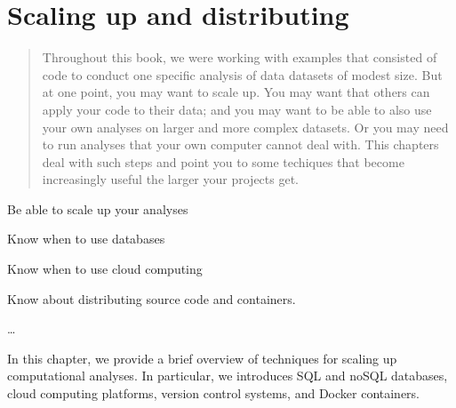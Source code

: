\chapter{Scaling up and distributing}
\label{chap:scalingup}

\begin{abstract}
  Throughout this book, we were working with examples that consisted of
  code to conduct one specific analysis of data datasets of modest size.
  But at one point, you may want to scale up. You may want that others
  can apply your code to their data; and you may want to be able to also
  use your own analyses on larger and more complex datasets. Or you may
  need to run analyses that your own computer cannot deal with.
  This chapters deal with such  steps and point you to some techiques that become increasingly useful
  the larger your projects get.  
\end{abstract}



\begin{objectives}
\item Be able to scale up your analyses
\item Know when to use databases
\item Know when to use cloud computing
\item Know about distributing source code and containers.
\item \ldots
\end{objectives}

\begin{feature}
In this chapter, we provide a brief overview of techniques for scaling up computational analyses. In particular, we introduces SQL and noSQL databases, cloud computing platforms, version control systems, and Docker containers.
\end{feature}









